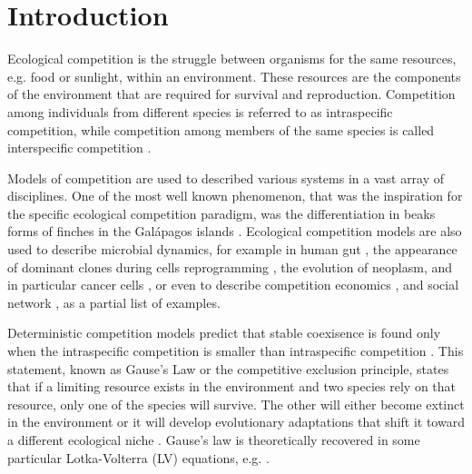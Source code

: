 \documentclass[%
 amsmath,amssymb,
 reprint,%
]{revtex4-2}
\begin{document}
\maketitle


\section{\label{sec:introduction}Introduction}

Ecological competition is the struggle between organisms for the same resources, e.g. food or sunlight, within an environment. 
These resources are the components of the environment that are required for survival and reproduction. 
Competition among individuals from different species is referred to as intraspecific competition, while competition among members of the same species is called interspecific competition \cite{grover1997resource,begon2006ecology,pocheville2015ecological}.  

Models of competition are used to described various systems in a vast array of disciplines. 
One of the most well known phenomenon, that was the inspiration for the specific ecological competition paradigm, was the differentiation in beaks forms of finches in the Gal\'apagos islands \cite{lewin1983finches,lack1983darwin}. Ecological competition models are also used to describe microbial dynamics, for example in human gut \cite{coyte2015ecology,gorter2020understanding}, the appearance of dominant clones during cells reprogramming \cite{shakiba2019cell}, the evolution of neoplasm, and in particular cancer cells \cite{merlo2006cancer,kareva2015cancer}, or even to describe competition  economics \cite{budzinski2007monoculture}, and social network \cite{koura2017competitive}, as a partial list of examples.

Deterministic competition models predict that stable coexisence is found only when the intraspecific competition is smaller than intraspecific competition  \cite{hardin1960competitive,macarthur1967limiting,MacArthur1969species, gause2019struggle}. This statement, known as Gause's Law or the competitive exclusion principle, states that if a limiting resource exists in the environment and two species rely on that resource, only one of the species will survive. The other will either become extinct in the environment or it will develop evolutionary adaptations that shift it toward a different ecological niche \cite{hardin1960competitive}. Gause’s law is
theoretically recovered in some particular Lotka-Volterra (LV) equations, e.g. \cite{macarthur1967limiting,MacArthur1969species}.
\end{document}
